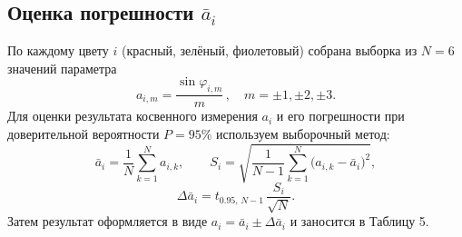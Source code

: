 \subsection*{Оценка погрешности \(\bar a_i\)}

По каждому цвету \(i\) (красный, зелёный, фиолетовый) собрана выборка из \(N=6\) значений параметра
\[
	a_{i,m} = \frac{\sin\varphi_{i,m}}{m}\,, \quad m=\pm1,\pm2,\pm3.
\]
Для оценки результата косвенного измерения \(a_i\) и его погрешности при доверительной
вероятности \(P=95\%\) используем выборочный метод:
\[
	\bar a_i = \frac{1}{N}\sum_{k=1}^N a_{i,k},
	\qquad
	S_i = \sqrt{\frac{1}{N-1}\sum_{k=1}^N\bigl(a_{i,k}-\bar a_i\bigr)^2},
\]
\[
	\Delta\bar a_i = t_{0.95,\,N-1}\,\frac{S_i}{\sqrt{N}}.
\]
Затем результат оформляется в виде
\(\displaystyle a_i = \bar a_i \pm \Delta\bar a_i\)
и заносится в Таблицу 5.
